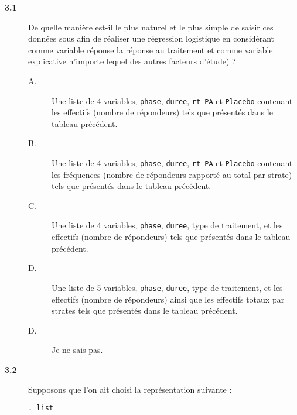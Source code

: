 \begin{description}
\item[\bf 3.1] De quelle manière est-il le plus naturel et le plus simple de
  saisir ces données sous \Stata afin de réaliser une régression logistique
  en considérant comme variable réponse la réponse au traitement et comme
  variable explicative n'importe lequel des autres facteurs d'étude) ?
\begin{description}
\item[A.] Une liste de 4 variables, \texttt{phase}, \texttt{duree},
  \texttt{rt-PA} et \texttt{Placebo} contenant les effectifs (nombre de
  répondeurs) tels que présentés dans le tableau précédent.
\item[B.] Une liste de 4 variables, \texttt{phase}, \texttt{duree},
  \texttt{rt-PA} et \texttt{Placebo} contenant les fréquences (nombre de
  répondeurs rapporté au total par strate) tels que présentés dans le
  tableau précédent. 
\item[C.] Une liste de 4 variables, \texttt{phase}, \texttt{duree}, type
  de traitement, et les effectifs (nombre de répondeurs) tels que
  présentés dans le tableau précédent.
\item[D.] Une liste de 5 variables, \texttt{phase}, \texttt{duree}, type
  de traitement, et les effectifs (nombre de répondeurs) ainsi que les
  effectifs totaux par strates tels que présentés dans le tableau précédent.
\item[D.] Je ne sais pas.
\end{description}
\item[\bf 3.2] Supposons que l'on ait choisi la représentation suivante :
\begin{verbatim}
. list


\end{verbatim}
\end{description}
